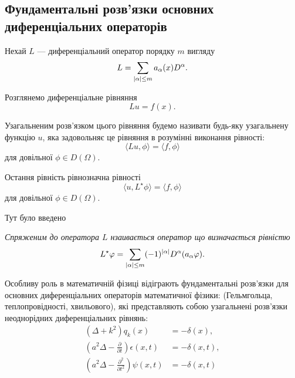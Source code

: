\subsection{Фундаментальні розв'язки основних диференціальних операторів}

Нехай $L$ --- диференціальний оператор порядку $m$ вигляду
\begin{equation}
	L = \displaystyle\sum\limits_{|\alpha|\le m}a_\alpha(x)D^\alpha.
\end{equation}

Розглянемо диференціальне рівняння
\begin{equation}
	L u = f(x).
\end{equation}

\begin{definition}
	Узагальненим розв'язком цього рівняння будемо називати будь-яку узагальнену функцію $u$, яка задовольняє це рівняння в розумінні виконання рівності:
	\begin{equation}
		\langle L u, \phi \rangle = \langle f, \phi \rangle
	\end{equation}
	для довільної $\phi \in D(\Omega)$.
\end{definition}

Остання рівність рівнозначна рівності
\begin{equation}
	\langle u, L^\star \phi \rangle = \langle f, \phi \rangle
\end{equation}
для довільної $\phi \in D(\Omega)$. \medskip

Тут було введено
\begin{definition}
	\it{Спряженим} до оператора $L$ нзаивається оператор що визначається рівністю
	\begin{equation}
		L^\star \varphi = \displaystyle\sum\limits_{|\alpha|\le m} (-1)^{|\alpha|} D^\alpha (a_\alpha \varphi).
	\end{equation}
\end{definition}

Особливу роль в математичній фізиці відіграють фундаментальні роз\-в'яз\-ки для основних диференціальних операторів математичної фізики: (Гельмгольца, теплопровідності, хвильового), які представляють собою узагальнені розв'язки неоднорідних диференціальних рівнянь:
\begin{align}
	(\Delta + k^2) q_k(x) &= - \delta(x), \\
	\left( a^2 \Delta - \frac{\partial}{\partial t} \right) \epsilon(x, t) &= - \delta(x, t), \\
	\left( a^2 \Delta - \frac{\partial^2}{\partial t^2} \right) \psi(x, t) &= - \delta(x, t)
\end{align}

